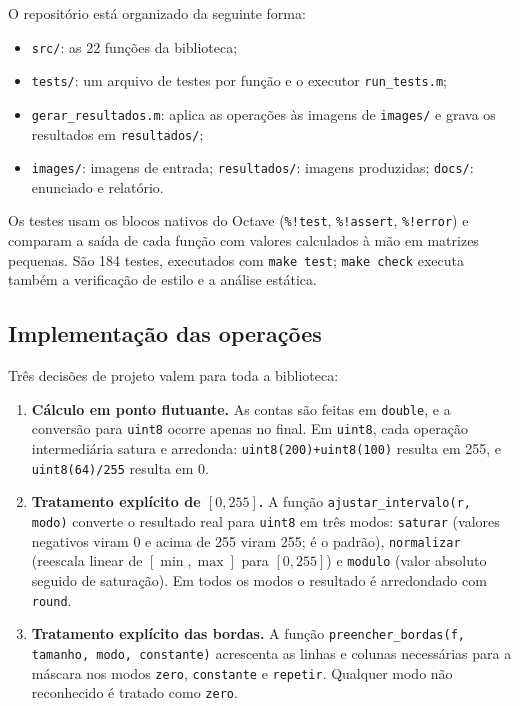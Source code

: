 \documentclass[11pt,a4paper]{article}
\begin{document}
O repositório está organizado da seguinte forma:
\begin{itemize}
  \item \texttt{src/}: as 22 funções da biblioteca;
  \item \texttt{tests/}: um arquivo de testes por função e o executor \texttt{run\_tests.m};
  \item \texttt{gerar\_resultados.m}: aplica as operações às imagens de \texttt{images/} e grava os resultados em \texttt{resultados/};
  \item \texttt{images/}: imagens de entrada; \texttt{resultados/}: imagens produzidas; \texttt{docs/}: enunciado e relatório.
\end{itemize}

Os testes usam os blocos nativos do Octave (\texttt{\%!test}, \texttt{\%!assert}, \texttt{\%!error}) e comparam a saída de cada função com valores calculados à mão em matrizes pequenas. São 184 testes, executados com \texttt{make test}; \texttt{make check} executa também a verificação de estilo e a análise estática.

\subsection{Implementação das operações}

Três decisões de projeto valem para toda a biblioteca:
\begin{enumerate}
  \item \textbf{Cálculo em ponto flutuante.} As contas são feitas em \texttt{double}, e a conversão para \texttt{uint8} ocorre apenas no final. Em \texttt{uint8}, cada operação intermediária satura e arredonda: \texttt{uint8(200)+uint8(100)} resulta em 255, e \texttt{uint8(64)/255} resulta em 0.
  \item \textbf{Tratamento explícito de $[0,255]$.} A função \texttt{ajustar\_intervalo(r, modo)} converte o resultado real para \texttt{uint8} em três modos: \texttt{saturar} (valores negativos viram 0 e acima de 255 viram 255; é o padrão), \texttt{normalizar} (reescala linear de $[\min,\max]$ para $[0,255]$) e \texttt{modulo} (valor absoluto seguido de saturação). Em todos os modos o resultado é arredondado com \texttt{round}.
  \item \textbf{Tratamento explícito das bordas.} A função \texttt{preencher\_bordas(f, tamanho, modo, constante)} acrescenta as linhas e colunas necessárias para a máscara nos modos \texttt{zero}, \texttt{constante} e \texttt{repetir}. Qualquer modo não reconhecido é tratado como \texttt{zero}.
\end{enumerate}
\end{document}
